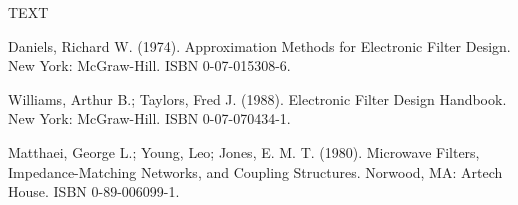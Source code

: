 \documentclass[journal abbreviation, manuscript]{copernicus}
\begin{document}

\begin{acknowledgements}
TEXT
\end{acknowledgements}




\begin{thebibliography}{}

Daniels, Richard W. (1974). Approximation Methods for Electronic Filter Design. New York: McGraw-Hill. ISBN 0-07-015308-6.

Williams, Arthur B.; Taylors, Fred J. (1988). Electronic Filter Design Handbook. New York: McGraw-Hill. ISBN 0-07-070434-1.

Matthaei, George L.; Young, Leo; Jones, E. M. T. (1980). Microwave Filters, Impedance-Matching Networks, and Coupling Structures. Norwood, MA: Artech House. ISBN 0-89-006099-1.

\end{thebibliography}







\end{document}
